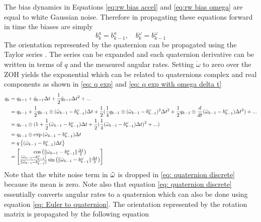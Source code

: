 The bias dynamics in Equations \eqref{eq:rw bias accel} and \eqref{eq:rw bias omega} are equal to white Gaussian noise. Therefore in propagating these equations forward in time the biases are simply
\begin{equation}
b^a_k = b^a_{k-1}, \quad b^{\omega}_k = b^{\omega}_{k-1}
\label{eq: bias discrete}
\end{equation}
The orientation represented by the quaternion can be propagated using the Taylor series \cite{Quaternion_Kinematics_for_the_Error-state_EKF}. The series can be expanded and each quaternion derivative can be written in terms of $q$ and the measured angular rates. Setting $\dot{\omega}$ to zero over the ZOH yields the exponential which can be related to quaternions complex and real components as shown in \eqref{eq: q exp} and \eqref{eq: q exp with omega delta t}
\begin{equation}
    \begin{split}
        q_k &= q_{k-1} + \dot{q}_{k-1} \Delta t + \frac{1}{2} \Ddot{q}_{k-1} \Delta t^2 + ...\\
         &= q_{k-1} + \frac{1}{2} q_{k-1} \otimes (\Tilde{\omega} _{k-1}- b^{\omega}_{k-1}) \Delta t + \frac{1}{2} (\frac{1}{4} q_{k-1} \otimes (\Tilde{\omega} _{k-1}- b^{\omega}_{k-1})^2 \Delta t^2 + \frac{1}{2} q_{k-1} \otimes \frac{d}{dt}(\Tilde{\omega} _{k-1}- b^{\omega}_{k-1}) \Delta t^2) + ...\\
        &= q_{k-1} \otimes (1 + \frac{1}{2} (\Tilde{\omega} _{k-1}- b^{\omega}_{k-1}) \Delta t + \frac{1}{2} (\frac{1}{4} (\Tilde{\omega} _{k-1}- b^{\omega}_{k-1}) \Delta t)^2 + ...)\\
        &= q_{k-1} \otimes \exp{(\Tilde{\omega} _{k-1}- b^{\omega}_{k-1}) \Delta t} \\
        &= q\left\{ (\Tilde{\omega}_{k-1} - b^{\omega}_{k-1}) \Delta t \right\} \\
        &= 
            \begin{bmatrix}
                \cos{\left(\|\Tilde{\omega}_{k-1} - b^{\omega}_{k-1}\|  \frac{\Delta t}{2} \right)} \\
                \frac{ (\Tilde{\omega}_{k-1} - b^{\omega}_{k-1})}{\|\Tilde{\omega}_{k-1} - b^{\omega}_{k-1}\|} \sin{\left( \|\Tilde{\omega}_{k-1} - b^{\omega}_{k-1}\|  \frac{\Delta t}{2} \right)} 
            \end{bmatrix}
    \end{split}
\label{eq: quaternion discrete}
\end{equation}
Note that the white noise term in $\Tilde{\omega}$ is dropped in \eqref{eq: quaternion discrete} because its mean is zero. Note also that equation \eqref{eq: quaternion discrete} essentially converts angular rates to a quaternion which can also be done using equation \eqref{eq: Euler to quaternion}. The orientation represented by the rotation matrix is propagated by the following equation
